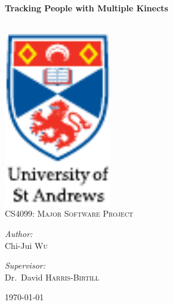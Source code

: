 
\begin{titlepage}

\begin{center}

\HRule \\[0.4cm]
{\huge \bfseries Tracking People with Multiple Kinects
\\[0.4cm] }

\HRule \\[3cm]


\includegraphics[width=0.35\textwidth]{figs/st-andrews-logo}~\\[1cm]

\textsc{\Large CS4099: Major Software Project}\\[1cm]

\noindent

\begin{minipage}{0.3\textwidth}

\begin{center} \large

\emph{Author:}\\

Chi-Jui \textsc{Wu}

\end{center}

\end{minipage}%
\begin{minipage}{0.3\textwidth}

\begin{center} \large

\emph{Supervisor:} \\

Dr.~David \textsc{Harris-Birtill}

\end{center}

\end{minipage}%

\vfill

{\large \today}

\end{center}

\end{titlepage}
